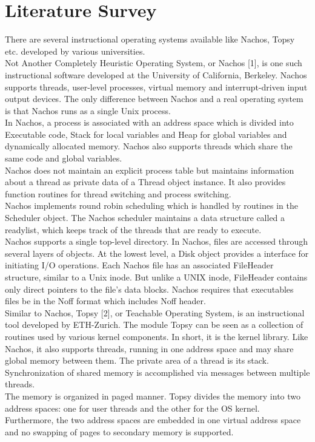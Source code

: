 \chapter{Literature Survey}
\label{chap3}

There are several instructional operating systems available like Nachos, Topsy etc. developed by various universities.\\

Not Another Completely Heuristic Operating System, or Nachos [1], is one such instructional software developed at the University of California, Berkeley. Nachos supports threads, user-level processes, virtual memory and interrupt-driven input output devices. The only difference between Nachos and a real operating system is that Nachos runs as a single Unix process. \\ 

In Nachos, a process is associated with an address space which is divided into Executable code, Stack for local variables and Heap for global variables and dynamically allocated memory. Nachos also supports threads which share the same code and global variables.\\

Nachos does not maintain an explicit process table but maintains information about a thread  as private data of a Thread object instance. It also provides function routines for thread switching and process switching. \\

Nachos implements round robin scheduling which is handled by routines in the Scheduler object. The Nachos scheduler maintains a data structure called a readylist, which keeps track of the threads that are ready to execute.\\

Nachos supports a single top-level directory. In Nachos, files are accessed through several layers of objects. At the lowest level, a Disk object provides a interface for initiating I/O operations. Each Nachos file has an associated FileHeader structure, similar to a Unix inode. But unlike  a UNIX inode, FileHeader contains only direct pointers to the file's data blocks. Nachos requires that executables files be in the Noff format which includes Noff header.\\ 

Similar to Nachos, Topsy [2], or Teachable Operating System, is an instructional tool developed by ETH-Zurich. The module Topsy can be seen as a collection of routines used by various kernel components. In short, it is the kernel library. Like Nachos, it also supports threads, running in one address space and may share global memory between them. The private area of a thread is its stack. Synchronization of shared memory is accomplished via messages between multiple threads.\\

The memory is organized in paged manner. Topsy divides the memory into two address spaces: one for user threads and the other for the OS kernel.  Furthermore, the two address spaces are embedded in one virtual address space and no swapping of pages to secondary memory is supported.
